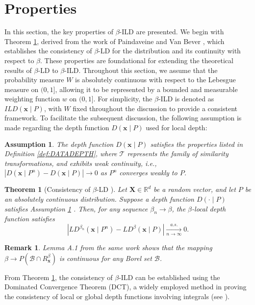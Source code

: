 \documentclass[final,3p,times]{elsarticle}
\newtheorem{remark}{\bf Remark}[section]
\newtheorem{theorem}{\bf Theorem}[section]
\newcommand{\vecx}{\mathbf{x}}
\newcommand{\vecX}{\mathbf{X}}
\newtheorem{assumption}{Assumption}
\begin{document}
\section{Properties}\label{sec:property}
\newtheorem{property}{Property}
In this section, the key properties of $\beta$-ILD are presented. We begin with Theorem \ref{thm:consis1}, derived from the work of Paindaveine and Van Bever \cite{paindaveine2013depth}, which establishes the consistency of $\beta$-LD for the distribution and its continuity with respect to $\beta$. These properties are foundational for extending the theoretical results of $\beta$-LD to $\beta$-ILD.
Throughout this section, we assume that the probability measure $W$ is absolutely continuous with respect to the Lebesgue measure on $(0,1]$, allowing it to be represented by a bounded and measurable weighting function $w$ on $(0,1]$. For simplicity, the $\beta$-ILD is denoted as $ILD(\vecx \mid P)$, with $W$ fixed throughout the discussion to provide a consistent framework.
To facilitate the subsequent discussion, the following assumption is made regarding the depth function $D(\vecx \mid P)$ used for local depth:
\begin{assumption}\label{assump:depth} The depth function $D(\vecx \mid P)$ satisfies the properties listed in Definition \ref{def:DATADEPTH}, where $\mathcal{T}$ represents the family of similarity transformations, and exhibits weak continuity, i.e., $|D(\vecx \mid P^n) - D(\vecx \mid P)| \to 0$ as $P^n$ converges weakly to $P$. \end{assumption}
\begin{theorem}[Consistency of $\beta$-LD \cite{paindaveine2013depth}]\label{thm:consis1}
      Let $\vecX \in \mathbb{R}^d$ be a random vector, and let $P$ be an absolutely continuous distribution. Suppose a depth function $ D(\cdot \mid P)$ satisfies Assumption \ref{assump:depth} . Then, for any sequence $\beta_n \to \beta$, the $\beta$-local depth function satisfies
    \[
    |LD^{\beta_n}(\vecx \mid P^{n}) - LD^{\beta}(\vecx \mid P)| \xrightarrow[n \to \infty]{a.s.} 0.
    \]
\end{theorem}
\begin{remark}
    Lemma A.1 from the same work shows that the mapping $\beta \to P(\mathcal{B} \cap R^\beta_\vecx)$ is continuous for any Borel set $\mathcal{B}$.
\end{remark}
From Theorem \ref{thm:consis1}, the consistency of $\beta$-ILD can be established using the Dominated Convergence Theorem (DCT), a widely employed method in proving the consistency of local or global depth functions involving integrals (see \cite{Piana2022,nagy2016integrated}).
\end{document}
